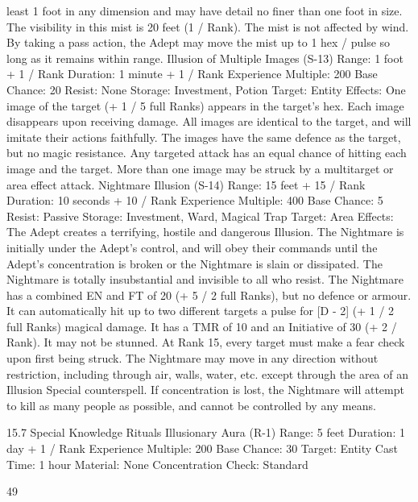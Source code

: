 \documentclass[a4paper]{article}
\begin{document}
\begin{multicols}{3}
least 1 foot in any dimension and may have detail
no finer than one foot in size. The visibility in this
mist is 20 feet (1 / Rank). The mist is not affected
by wind. By taking a pass action, the Adept may
move the mist up to 1 hex / pulse so long as it
remains within range.
Illusion of Multiple Images (S-13)
Range: 1 foot + 1 / Rank
Duration: 1 minute + 1 / Rank
Experience Multiple: 200
Base Chance: 20%
Resist: None
Storage: Investment, Potion
Target: Entity
Effects: One image of the target (+ 1 / 5 full Ranks)
appears in the target’s hex. Each image disappears
upon receiving damage. All images are identical to
the target, and will imitate their actions faithfully.
The images have the same defence as the target,
but no magic resistance. Any targeted attack has an
equal chance of hitting each image and the target.
More than one image may be struck by a multitarget or area effect attack.
Nightmare Illusion (S-14)
Range: 15 feet + 15 / Rank
Duration: 10 seconds + 10 / Rank
Experience Multiple: 400
Base Chance: 5%
Resist: Passive
Storage: Investment, Ward, Magical Trap
Target: Area
Effects: The Adept creates a terrifying, hostile and
dangerous Illusion. The Nightmare is initially
under the Adept’s control, and will obey their
commands until the Adept’s concentration is broken or the Nightmare is slain or dissipated. The
Nightmare is totally insubstantial and invisible to
all who resist. The Nightmare has a combined EN
and FT of 20 (+ 5 / 2 full Ranks), but no defence or
armour. It can automatically hit up to two different
targets a pulse for [D - 2] (+ 1 / 2 full Ranks)
magical damage. It has a TMR of 10 and an Initiative of 30 (+ 2 / Rank). It may not be stunned. At
Rank 15, every target must make a fear check upon
first being struck. The Nightmare may move in any
direction without restriction, including through air,
walls, water, etc. except through the area of an
Illusion Special counterspell. If concentration is
lost, the Nightmare will attempt to kill as many
people as possible, and cannot be controlled by any
means.

15.7 Special Knowledge Rituals
Illusionary Aura (R-1)
Range: 5 feet
Duration: 1 day + 1 / Rank
Experience Multiple: 200
Base Chance: 30%
Target: Entity
Cast Time: 1 hour
Material: None
Concentration Check: Standard

49


\end{multicols}
\end{document}
